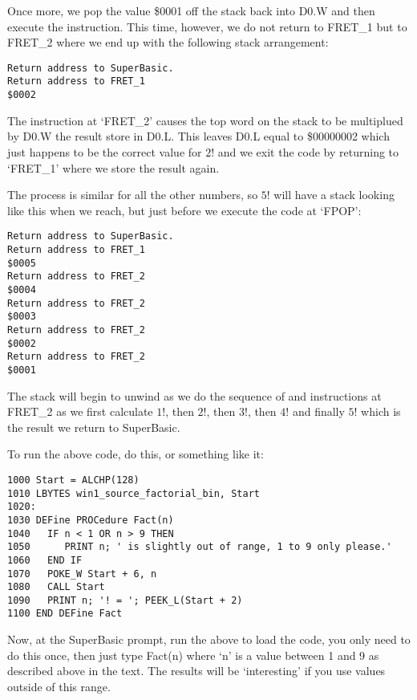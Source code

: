 Once more, we pop the value \$0001 off the stack back into D0.W and
      then execute the  instruction. This time, however, we do not return
      to FRET\_1 but to FRET\_2 where we end up with the following stack
      arrangement:

\begin{lstlisting}[firstnumber=1,frame=none,numbers=none]
Return address to SuperBasic.
Return address to FRET_1
$0002
\end{lstlisting}

The instruction at `FRET\_2' causes the top word on the stack to be
      multiplued by D0.W the result store in D0.L. This leaves D0.L equal to
      \$00000002 which just happens to be the correct value for $2!$ and we exit
      the code by returning to `FRET\_1' where we store the result
      again.

The process is similar for all the other numbers, so $5!$ will have
      a stack looking like this when we reach, but just before we execute the
      code at `FPOP':

\begin{lstlisting}[firstnumber=1,frame=none,numbers=none]
Return address to SuperBasic.
Return address to FRET_1
$0005
Return address to FRET_2
$0004
Return address to FRET_2
$0003
Return address to FRET_2
$0002
Return address to FRET_2
$0001
\end{lstlisting}

The stack will begin to unwind as we do the sequence of  and
       instructions at FRET\_2 as we first calculate $1!$, then $2!$, then $3!$,
      then $4!$ and finally $5!$ which is the result we return to
      SuperBasic.

To run the above code, do this, or something like it:

\begin{lstlisting}[firstnumber=1,language={}]
1000 Start = ALCHP(128)
1010 LBYTES win1_source_factorial_bin, Start
1020:
1030 DEFine PROCedure Fact(n)
1040   IF n < 1 OR n > 9 THEN
1050      PRINT n; ' is slightly out of range, 1 to 9 only please.'
1060   END IF
1070   POKE_W Start + 6, n
1080   CALL Start
1090   PRINT n; '! = '; PEEK_L(Start + 2)
1100 END DEFine Fact
\end{lstlisting}

Now, at the SuperBasic prompt, run the above to load the code, you
      only need to do this once, then just type Fact(n) where `n' is a value
      between 1 and 9 as described above in the text. The results will be
      `interesting' if you use values outside of this range.

